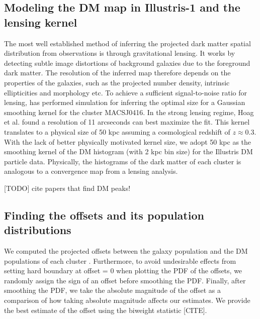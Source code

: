 \subsection{Modeling the DM map in Illustris-1 and the lensing kernel}
The most well established method of inferring the projected dark matter spatial 
distribution from observations is through gravitational lensing.
It works by detecting subtle image distortions of background galaxies due to
the foreground dark matter. The resolution of the inferred map therefore 
depends on the properties of the galaxies, such as the projected number density, 
intrinsic ellipticities and morphology etc.
To achieve a sufficient signal-to-noise ratio for lensing, 
\citealt{Hoag2016}  has performed simulation for inferring the optimal size
for a Gaussian smoothing kernel for the cluster MACSJ0416. 
In the strong lensing regime, Hoag et al. found a resolution of 11 arcseconds
can best maximize the fit. This kernel translates to a physical size of 50 
kpc assuming a cosmological redshift of $z \approx 0.3$.
With the lack of better physically motivated kernel size, we adopt 50 kpc as
the smoothing kernel of the DM histogram (with 2 kpc bin size) for the
Illustris DM particle data.
Physically, the histograms of the dark matter of each cluster 
is analogous to a convergence map from a lensing analysis. 




[TODO] cite papers that find DM peaks!
\subsection{Finding the offsets and its population distributions} 
We computed the projected offsets between the galaxy population and the DM
populations of each cluster .  
Furthermore, to avoid undesirable effects from setting hard boundary at offset
= 0 when plotting the PDF of the offsets, we randomly assign the sign of an
offset before smoothing the PDF. Finally, after smoothing the PDF, we take the
absolute magnitude of the offset as a comparison of how taking absolute
magnitude affects our estimates. We provide the best estimate of the offset
using the biweight statistic [CITE].


